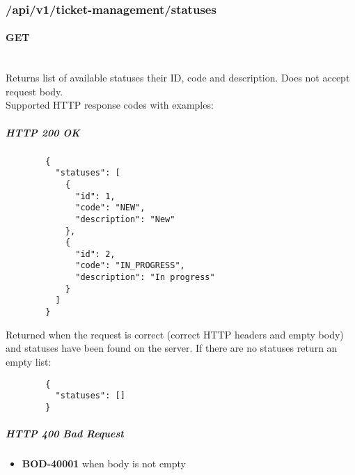 \documentclass[a4paper]{article}
\newcommand{\newLineParagraph}[1]{\paragraph{#1}\mbox{}\\}
\begin{document}
    \subsubsection{/api/v1/ticket-management/statuses}
    \newLineParagraph{GET}
    Returns list of available statuses their ID, code and description. Does not accept request body. \\
    Supported HTTP response codes with examples:
    \subparagraph{HTTP 200 OK}
    \begin{verbatim}
        {
          "statuses": [
            {
              "id": 1,
              "code": "NEW",
              "description": "New"
            },
            {
              "id": 2,
              "code": "IN_PROGRESS",
              "description": "In progress"
            }
          ]
        }
    \end{verbatim}
    Returned when the request is correct (correct HTTP headers and empty body) and statuses have been found on the server. If there are no statuses return an empty list:
    \begin{verbatim}
        {
          "statuses": []
        }
    \end{verbatim}

    \subparagraph{HTTP 400 Bad Request}
    \begin{itemize}
        \item \textbf{BOD-40001} when body is not empty
    \end{itemize}
\end{document}
